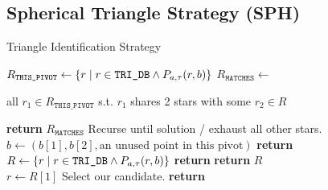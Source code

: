 
\subsection{Spherical Triangle Strategy (SPH)}\label{subsec:sphericalTriangleMethod}
\begin{algorithm}
    \caption{Triangle Identification Strategy} \label{algorithm:triangleIdentification}
    \begin{algorithmic}[1]
        \State $R_\texttt{THIS\_PIVOT} \gets \left\{  r \mid r \in \texttt{TRI\_DB}
        \land P_{a, \tau}(r, b)  \right\}$
        \State $R_\texttt{MATCHES} \gets $ \parbox[t]{0.7\textwidth}{\raggedright all $r_1 \in R_\texttt{THIS\_PIVOT}$ s.t. $r_1$ shares 2 stars with \newline some $r_2 \in R$}
        \State \textbf{return} $R_\texttt{MATCHES}$ 
        \Else \Comment Recurse until solution / exhaust all other stars.
        \State $b \gets \left( b[1], b[2], \text{an unused point in this pivot} \right)$
        \State \textbf{return} 
        \EndIf
        \EndFunction
        \\
    	\State $R \gets \left\{  r \mid r \in \texttt{TRI\_DB} \land P_{a, \tau}(r, b)  \right\}$
    	\State \textbf{return} 
    	\Else
    	\State \textbf{return} $R$
    	\EndIf
    	\EndFunction
        \\
        \State $r \gets R[1]$ \Comment Select our candidate.
        \State \textbf{return} 
        \EndFunction
        \\

\end{algorithmic}
\end{algorithm}
